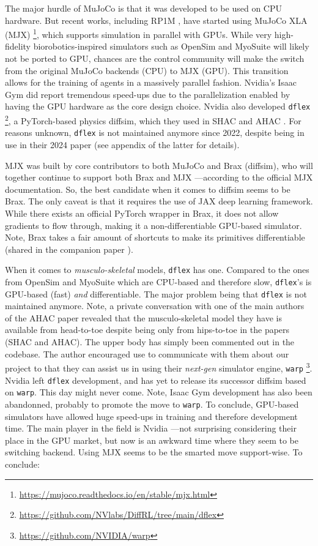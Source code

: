 \documentclass[12pt,a4paper]{article}
\begin{document}
The major hurdle of MuJoCo is that it was developed to be used on CPU hardware.
But recent works, including RP1M \cite{Zhao2024-vv},
have started using MuJoCo XLA (MJX)
\footnote{\url{https://mujoco.readthedocs.io/en/stable/mjx.html}},
which supports simulation in parallel with GPUs.
While very high-fidelity biorobotics-inspired simulators such as
OpenSim \cite{Seth2011-ru} and
MyoSuite \cite{Caggiano2022-ag}
will likely not be ported to GPU, chances are the control community will make the switch
from the original MuJoCo backends (CPU) to MJX (GPU).
This transition allows for the training of agents in a massively parallel fashion.
Nvidia's Isaac Gym \cite{Makoviychuk2021-wv} did report tremendous speed-ups due to the
parallelization enabled by having the GPU hardware as the core design choice.
Nvidia also developed \texttt{dflex}
\footnote{\url{https://github.com/NVlabs/DiffRL/tree/main/dflex}},
a PyTorch-based physics diffsim, which they used in
SHAC \cite{Xu2022-bz} and AHAC \cite{Georgiev2024-rs}.
For reasons unknown, \texttt{dflex} is not maintained anymore since 2022, despite being in use
in their 2024 paper (see appendix of the latter for details).

MJX was built by core contributors to both MuJoCo
and Brax \cite{Daniel_Freeman2021-az} (diffsim),
who will together continue to support both Brax and MJX
---according to the official MJX documentation.
So, the best candidate when it comes to diffsim seems to be Brax.
The only caveat is that it requires the use of JAX deep learning framework.
While there exists an official PyTorch wrapper in Brax, it does not allow gradients to flow
through, making it a non-differentiable GPU-based simulator.
Note, Brax takes a fair amount of shortcuts to make its primitives differentiable
(shared in the companion paper \cite{Daniel_Freeman2021-az}).

When it comes to \emph{musculo-skeletal} models, \texttt{dflex} has one.
Compared to the ones from 
OpenSim \cite{Seth2011-ru} and
MyoSuite \cite{Caggiano2022-ag}
which are CPU-based and therefore slow,
\texttt{dflex}'s is GPU-based (fast) \emph{and} differentiable.
The major problem being that \texttt{dflex} is not maintained anymore.
Note, a private conversation with one of the main authors of the AHAC paper
revealed that the musculo-skeletal model they have is available from head-to-toe
despite being only from hips-to-toe in the papers (SHAC and AHAC).
The upper body has simply been commented out in the codebase.
The author encouraged use to communicate with them about our project to that they can
assist us in using their \textit{next-gen} simulator engine, \texttt{warp}
\footnote{\url{https://github.com/NVIDIA/warp}}.
Nvidia left \texttt{dflex} development, and has yet to release its successor diffsim
based on \texttt{warp}. This day might never come.
Note, Isaac Gym development has also been abandonned, probably to promote the move to
\texttt{warp}.
To conclude, GPU-based simulators have allowed huge speed-ups in training and therefore
development time. The main player in the field is Nvidia ---not surprising considering their
place in the GPU market, but now is an awkward time where they seem to be switching backend.
Using MJX seems to be the smarted move support-wise.
To conclude:
\end{document}
